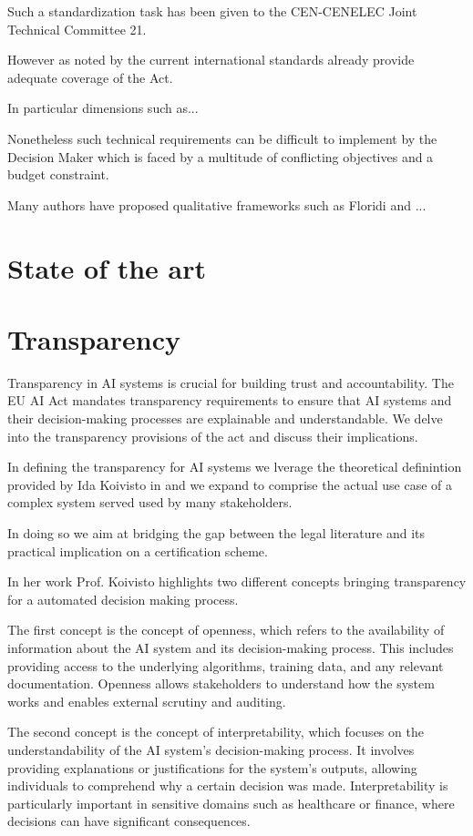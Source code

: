 \documentclass{article}
\begin{document}
	Such a standardization task has been given to the CEN-CENELEC Joint Technical Committee 21.
	
	However as noted by \cite{europeancommission.jointresearchcentre._2023a} the current international standards already provide adequate coverage of the Act.
	
	In particular dimensions such as...
	
	Nonetheless such technical requirements can be difficult to implement by the Decision Maker which is faced by a multitude of conflicting objectives and a budget constraint.
	
	Many authors have proposed qualitative frameworks such as Floridi and ... 
	
\section{State of the art}

\section{Transparency}
Transparency in AI systems is crucial for building trust and accountability. The EU AI Act mandates transparency requirements to ensure that AI systems and their decision-making processes are explainable and understandable. We delve into the transparency provisions of the act and discuss their implications.

In defining the transparency for AI systems we lverage the theoretical definintion provided by Ida Koivisto in and we expand to comprise the actual use case of a complex system served used by many stakeholders.

In doing so we aim at bridging the gap between the legal literature and its practical implication on a certification scheme.

In her work Prof. Koivisto highlights two different concepts bringing transparency for a automated decision making process.

The first concept is the concept of openness, which refers to the availability of information about the AI system and its decision-making process. This includes providing access to the underlying algorithms, training data, and any relevant documentation. Openness allows stakeholders to understand how the system works and enables external scrutiny and auditing.


The second concept is the concept of interpretability, which focuses on the understandability of the AI system's decision-making process. It involves providing explanations or justifications for the system's outputs, allowing individuals to comprehend why a certain decision was made. Interpretability is particularly important in sensitive domains such as healthcare or finance, where decisions can have significant consequences.
\end{document}
